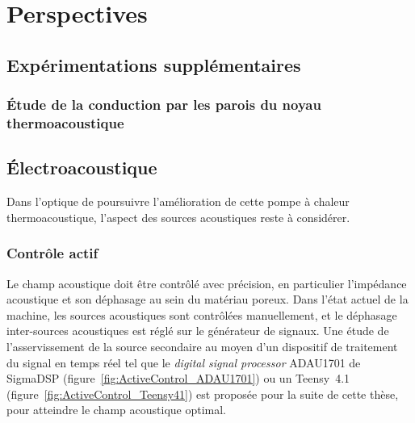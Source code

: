\chapter{Perspectives}\label{chap:Persp}%
\mylocaltoc




\section{Expérimentations supplémentaires}

\subsection{\'Etude de la conduction par les parois du noyau thermoacoustique}


\section{\'Electroacoustique}

Dans l'optique de poursuivre l'amélioration de cette pompe à chaleur thermoacoustique, l'aspect des sources acoustiques reste à considérer.

\subsection{Contrôle actif}
Le champ acoustique doit être contrôlé avec précision, en particulier l'impédance acoustique et son déphasage au sein du matériau poreux. Dans l'état actuel de la machine, les sources acoustiques sont contrôlées manuellement, et le déphasage inter-sources acoustiques est réglé sur le générateur de signaux. Une étude de l'asservissement de la source secondaire au moyen d'un dispositif de traitement du signal en temps réel tel que le \textit{digital signal processor} ADAU1701 de SigmaDSP (figure~\ref{fig:ActiveControl_ADAU1701}) ou un Teensy~4.1 (figure~\ref{fig:ActiveControl_Teensy41}) est proposée pour la suite de cette thèse, pour atteindre le champ acoustique optimal.



